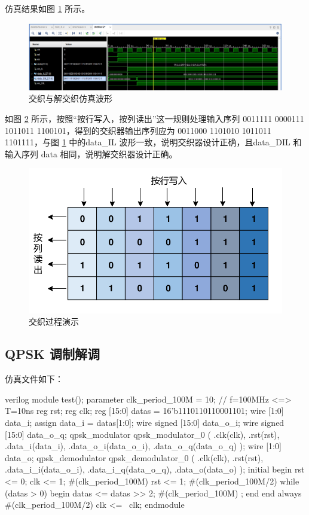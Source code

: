 仿真结果如图 \ref{fig:interleave_simulation1} 所示。

\begin{figure}[ht]
    \centering
    \includegraphics[width=1.0\textwidth]{static/interleave.png}
    \caption{交织与解交织仿真波形}
    \label{fig:interleave_simulation1}
\end{figure}

如图 \ref{fig:interleave_simulation2} 所示，按照“按行写入，按列读出”这一规则处理输入序列 0011111 0000111 1011011 1100101，得到的交织器输出序列应为 0011000 1101010 1011011 1101111，与图 \ref{fig:interleave_simulation1} 中的data\_IL 波形一致，说明交织器设计正确，且data\_DIL 和输入序列 data 相同，说明解交织器设计正确。

\begin{figure}[ht]
    \centering
    \includegraphics[width=.7\textwidth]{static/interleave_simulation.pdf}
    \caption{交织过程演示}
    \label{fig:interleave_simulation2}
\end{figure}

\subsection{QPSK 调制解调}

仿真文件如下：
\begin{codeblock}{verilog}
module test();
    parameter clk_period_100M = 10; // f=100MHz <=> T=10ns
    reg rst;
    reg clk;
    reg [15:0] datas = 16'b1110110110001101;
    wire [1:0] data_i;
    assign data_i = datas[1:0];
    wire signed [15:0] data_o_i;
    wire signed [15:0] data_o_q;
    qpsk_modulator qpsk_modulator_0 (
        .clk(clk),
        .rst(rst),
        .data_i(data_i),
        .data_o_i(data_o_i),
        .data_o_q(data_o_q)
    );
    wire [1:0] data_o;
    qpsk_demodulator qpsk_demodulator_0 (
        .clk(clk),
        .rst(rst),
        .data_i_i(data_o_i),
        .data_i_q(data_o_q),
        .data_o(data_o)
    );
    initial begin
        rst <= 0;
        clk <= 1;
        #(clk_period_100M) rst <= 1;
        #(clk_period_100M/2)
        while (datas > 0) begin
            datas <= datas >> 2;
            #(clk_period_100M) ;
        end
    end
    always #(clk_period_100M/2) clk <= ~clk;
endmodule
\end{codeblock}

